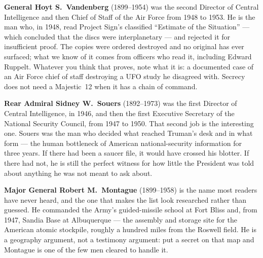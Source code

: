 \textbf{General Hoyt S.~Vandenberg} (1899--1954) was the second Director of Central Intelligence
and then Chief of Staff of the Air Force from 1948 to 1953. He is the man who, in 1948, read
Project Sign's classified ``Estimate of the Situation'' --- which concluded that the discs were
interplanetary --- and rejected it for insufficient proof. The copies were ordered destroyed and
no original has ever surfaced; what we know of it comes from officers who read it, including
Edward Ruppelt. Whatever you think that proves, note what it is: a documented case of an Air
Force chief of staff destroying a UFO study he disagreed with. Secrecy does not need a
Majestic~12 when it has a chain of command.

\textbf{Rear Admiral Sidney W.~Souers} (1892--1973) was the first Director of Central Intelligence,
in 1946, and then the first Executive Secretary of the National Security Council, from 1947 to
1950. That second job is the interesting one. Souers was the man who decided what reached
Truman's desk and in what form --- the human bottleneck of American national-security information
for three years. If there had been a saucer file, it would have crossed his blotter. If there had
not, he is still the perfect witness for how little the President was told about anything he was
not meant to ask about.

\textbf{Major General Robert M.~Montague} (1899--1958) is the name most readers have never heard,
and the one that makes the list look researched rather than guessed. He commanded the Army's
guided-missile school at Fort Bliss and, from 1947, Sandia Base at Albuquerque --- the assembly and
storage site for the American atomic stockpile, roughly a hundred miles from the Roswell field.
He is a geography argument, not a testimony argument: put a secret on that map and Montague is one
of the few men cleared to handle it.

